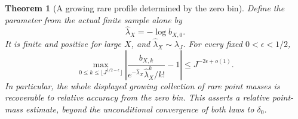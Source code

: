 \documentclass[11pt]{article}
\newtheorem{theorem}{Theorem}[section]
\theoremstyle{definition}
\begin{document}
\begin{theorem}[A growing rare profile determined by the zero bin]
\label{thm:zero-bin-poisson-reconstruction}
Define the parameter from the actual finite sample alone by
\begin{equation}
 \widehat\lambda_X=-\log b_{X,0}.
 \label{eq:zero-bin-poisson-parameter}
\end{equation}
It is finite and positive for large $X$, and
$\widehat\lambda_X\sim\lambda_J$.
For every fixed $0<\epsilon<1/2$,
\begin{equation}
 \max_{0\le k\le\lfloor J^{1/2-\epsilon}\rfloor}
 \left|
 \frac{b_{X,k}}
      {e^{-\widehat\lambda_X}\widehat\lambda_X^k/k!}-1
 \right|
       \le J^{-2\epsilon+o(1)}.
 \label{eq:zero-bin-relative-poisson-window}
\end{equation}
In particular, the whole displayed growing collection of rare
point masses is recoverable to relative accuracy from the zero
bin.  This asserts a relative point-mass estimate, beyond the
unconditional convergence of both laws to $\delta_0$.
\end{theorem}
\end{document}
